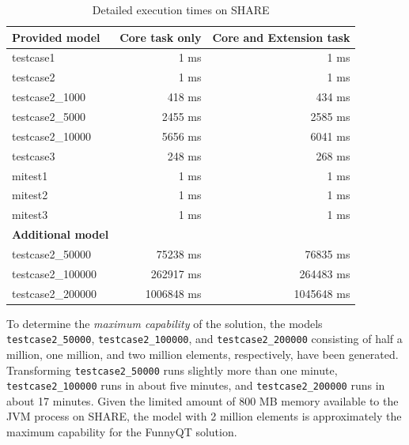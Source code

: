 \documentclass[11pt]{article}
\begin{document}
\begin{table}[htb]
  \centering
  \begin{tabular}{| l | r | r |}
    \hline
    \textbf{Provided model}    & \textbf{Core task only} & \textbf{Core and Extension task}\\
    \hline
    \textsf{testcase1}         & 1 ms      & 1 ms\\
    \textsf{testcase2}         & 1 ms      & 1 ms\\
    \textsf{testcase2\_1000}   & 418 ms    & 434 ms\\
    \textsf{testcase2\_5000}   & 2455 ms   & 2585 ms\\
    \textsf{testcase2\_10000}  & 5656 ms   & 6041 ms\\
    \textsf{testcase3}         & 248 ms    & 268 ms\\
    \hline
    \textsf{mitest1}           & 1 ms      & 1 ms\\
    \textsf{mitest2}           & 1 ms      & 1 ms\\
    \textsf{mitest3}           & 1 ms      & 1 ms\\
    \hline
    \textbf{Additional model}  & & \\
    \hline
    \textsf{testcase2\_50000}  & 75238 ms  & 76835 ms\\
    \textsf{testcase2\_100000} & 262917 ms & 264483 ms\\
    \textsf{testcase2\_200000} & 1006848 ms & 1045648 ms\\
    \hline
  \end{tabular}
  \caption{Detailed execution times on SHARE}
  \label{tab:exec-times}
\end{table}

\begin{sloppypar}
  To determine the \emph{maximum capability} of the solution, the models
  \verb|testcase2_50000|, \verb|testcase2_100000|, and \verb|testcase2_200000|
  consisting of half a million, one million, and two million elements,
  respectively, have been generated.  Transforming \verb|testcase2_50000| runs
  slightly more than one minute, \verb|testcase2_100000| runs in about five
  minutes, and \verb|testcase2_200000| runs in about 17 minutes.  Given the
  limited amount of 800 MB memory available to the JVM process on SHARE, the
  model with 2 million elements is approximately the maximum capability for the
  FunnyQT solution.
\end{sloppypar}

\FloatBarrier



\end{document}
